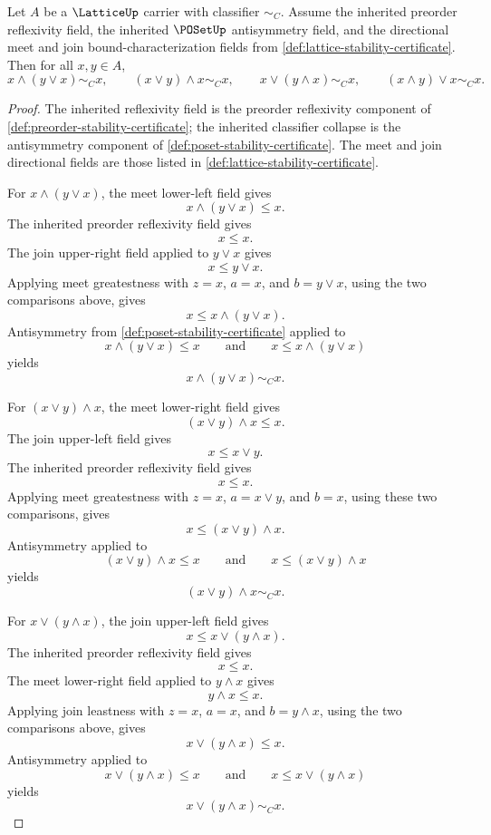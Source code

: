 \begin{theorem}
\label{thm:lattice-opposite-absorption-from-directional-bounds}
Let \(A\) be a \(\LatticeUp\) carrier with classifier \(\sim_C\). Assume the inherited preorder reflexivity field, the inherited \(\POSetUp\) antisymmetry field, and the directional meet and join bound-characterization fields from \autoref{def:lattice-stability-certificate}. Then for all \(x,y\in A\),
$$
  x\wedge(y\vee x)\sim_C x,\qquad
  (x\vee y)\wedge x\sim_C x,\qquad
  x\vee(y\wedge x)\sim_C x,\qquad
  (x\wedge y)\vee x\sim_C x .
$$
\end{theorem}
\begin{proof}
The inherited reflexivity field is the preorder reflexivity component of \autoref{def:preorder-stability-certificate}; the inherited classifier collapse is the antisymmetry component of \autoref{def:poset-stability-certificate}. The meet and join directional fields are those listed in \autoref{def:lattice-stability-certificate}.

For \(x\wedge(y\vee x)\), the meet lower-left field gives
$$
  x\wedge(y\vee x)\le x .
$$
The inherited preorder reflexivity field gives
$$
  x\le x .
$$
The join upper-right field applied to \(y\vee x\) gives
$$
  x\le y\vee x .
$$
Applying meet greatestness with \(z=x\), \(a=x\), and \(b=y\vee x\), using the two comparisons above, gives
$$
  x\le x\wedge(y\vee x) .
$$
Antisymmetry from \autoref{def:poset-stability-certificate} applied to
$$
  x\wedge(y\vee x)\le x
  \qquad\text{and}\qquad
  x\le x\wedge(y\vee x)
$$
yields
$$
  x\wedge(y\vee x)\sim_C x .
$$

For \((x\vee y)\wedge x\), the meet lower-right field gives
$$
  (x\vee y)\wedge x\le x .
$$
The join upper-left field gives
$$
  x\le x\vee y .
$$
The inherited preorder reflexivity field gives
$$
  x\le x .
$$
Applying meet greatestness with \(z=x\), \(a=x\vee y\), and \(b=x\), using these two comparisons, gives
$$
  x\le (x\vee y)\wedge x .
$$
Antisymmetry applied to
$$
  (x\vee y)\wedge x\le x
  \qquad\text{and}\qquad
  x\le (x\vee y)\wedge x
$$
yields
$$
  (x\vee y)\wedge x\sim_C x .
$$

For \(x\vee(y\wedge x)\), the join upper-left field gives
$$
  x\le x\vee(y\wedge x) .
$$
The inherited preorder reflexivity field gives
$$
  x\le x .
$$
The meet lower-right field applied to \(y\wedge x\) gives
$$
  y\wedge x\le x .
$$
Applying join leastness with \(z=x\), \(a=x\), and \(b=y\wedge x\), using the two comparisons above, gives
$$
  x\vee(y\wedge x)\le x .
$$
Antisymmetry applied to
$$
  x\vee(y\wedge x)\le x
  \qquad\text{and}\qquad
  x\le x\vee(y\wedge x)
$$
yields
$$
  x\vee(y\wedge x)\sim_C x .
$$


\end{proof}
